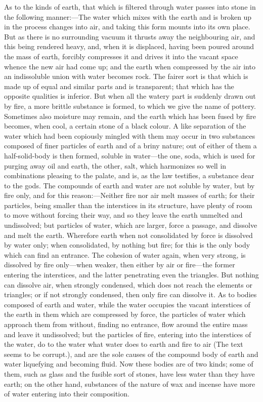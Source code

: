 As to the kinds of earth, that which is filtered through water passes into
stone in the following manner:—The water which mixes with the earth
and is broken up in the process changes into air, and taking this form
mounts into its own place. But as there is no surrounding vacuum it
thrusts away the neighbouring air, and this being rendered heavy, and,
when it is displaced, having been poured around the mass of earth,
forcibly compresses it and drives it into the vacant space whence the new
air had come up; and the earth when compressed by the air into an
indissoluble union with water becomes rock. The fairer sort is that which
is made up of equal and similar parts and is transparent; that which has
the opposite qualities is inferior. But when all the watery part is
suddenly drawn out by fire, a more brittle substance is formed, to which
we give the name of pottery. Sometimes also moisture may remain, and the
earth which has been fused by fire becomes, when cool, a certain stone of
a black colour. A like separation of the water which had been copiously
mingled with them may occur in two substances composed of finer particles
of earth and of a briny nature; out of either of them a half-solid-body is
then formed, soluble in water—the one, soda, which is used for
purging away oil and earth, the other, salt, which harmonizes so well in
combinations pleasing to the palate, and is, as the law testifies, a
substance dear to the gods. The compounds of earth and water are not
soluble by water, but by fire only, and for this reason:—Neither
fire nor air melt masses of earth; for their particles, being smaller than
the interstices in its structure, have plenty of room to move without
forcing their way, and so they leave the earth unmelted and undissolved;
but particles of water, which are larger, force a passage, and dissolve
and melt the earth. Wherefore earth when not consolidated by force is
dissolved by water only; when consolidated, by nothing but fire; for this
is the only body which can find an entrance. The cohesion of water again,
when very strong, is dissolved by fire only—when weaker, then either
by air or fire—the former entering the interstices, and the latter
penetrating even the triangles. But nothing can dissolve air, when
strongly condensed, which does not reach the elements or triangles; or if
not strongly condensed, then only fire can dissolve it. As to bodies
composed of earth and water, while the water occupies the vacant
interstices of the earth in them which are compressed by force, the
particles of water which approach them from without, finding no entrance,
flow around the entire mass and leave it undissolved; but the particles of
fire, entering into the interstices of the water, do to the water what
water does to earth and fire to air (The text seems to be corrupt.), and
are the sole causes of the compound body of earth and water liquefying and
becoming fluid. Now these bodies are of two kinds; some of them, such as
glass and the fusible sort of stones, have less water than they have
earth; on the other hand, substances of the nature of wax and incense have
more of water entering into their composition.

